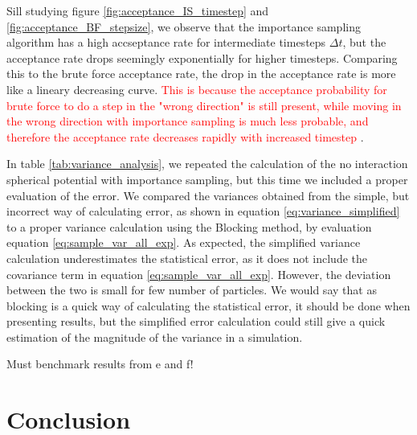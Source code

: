 \documentclass[norsk,a4paper,12pt]{article}
\begin{document}
Sill studying figure \ref{fig:acceptance_IS_timestep} and \ref{fig:acceptance_BF_stepsize}, we observe that the importance sampling algorithm has a high accseptance rate for intermediate timesteps $\Delta t$, but the acceptance rate drops seemingly exponentially for higher timesteps. Comparing this to the brute force acceptance rate, the drop in the acceptance rate is more like a lineary decreasing curve. \textcolor{red}{This is because the acceptance probability for brute force to do a step in the "wrong direction" is still present, while moving in the wrong direction with importance sampling is much less probable, and therefore the acceptance rate decreases rapidly with increased timestep }.
\par 
\vspace{3mm}

In table \ref{tab:variance_analysis}, we repeated the calculation of the no interaction spherical potential with importance sampling, but this time we included a proper evaluation of the error. We compared the variances obtained from the simple, but incorrect way of calculating error, as shown in equation \ref{eq:variance_simplified} to a proper variance calculation using the Blocking method, by evaluation equation \ref{eq:sample_var_all_exp}. As expected, the simplified variance calculation underestimates the statistical error, as it does not include the covariance term in equation \ref{eq:sample_var_all_exp}. However, the deviation between the two is small for few number of particles. We would say that as blocking is a quick way of calculating the statistical error, it should be done when presenting results, but the simplified error calculation could still give a quick estimation of the magnitude of the variance in a simulation.
\par 
\vspace{3mm}

Must benchmark results from e and f!


\section{Conclusion}

\newpage
\end{document}

